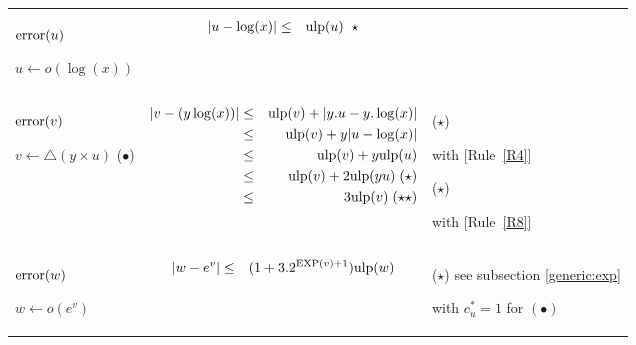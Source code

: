 \documentclass[12pt]{amsart}
\def\pinf{\bigtriangleup}
\def\ulp{{\rm ulp}}
\def\Exp{{\rm EXP}}
\newcommand{\U}[1]{\quad \mbox{[Rule~\ref{#1}]}}
\begin{document}
\begin{center}
\begin{tabular}{l l l}

\begin{minipage}{2.5cm}


${\textnormal{error}}(u)$


$u \leftarrow o(\log(x))$

\end{minipage} &
\begin{minipage}{7.5cm}

\begin{eqnarray}\nonumber
  |u-\log(x)| &\leq& \ulp(u)\;\;\star
\end{eqnarray}

\end{minipage} &
\begin{minipage}{6cm}

\end{minipage}\\%
\begin{minipage}{2.5cm}
${\textnormal{error}}(v)$


$v \leftarrow \pinf(y \times u) $
($\bullet$)
\end{minipage} &
\begin{minipage}{7.5cm}

\begin{eqnarray}\nonumber
  |v-(y\log(x))| &\leq& \ulp(v) + |y.u-y.\log(x)|\\\nonumber
   &\leq& \ulp(v) + y|u-\log(x)|\\\nonumber
   &\leq& \ulp(v) + y \ulp(u)\\\nonumber
   &\leq& \ulp(v) + 2 \ulp(yu) \;(\star)\\\nonumber
   &\leq& 3 \ulp(v)  \;(\star\star)
\end{eqnarray}


\end{minipage} &
\begin{minipage}{6cm}
($\star$)

with \U{R4}

($\star$)

with \U{R8}

\end{minipage}\\%
\begin{minipage}{2.5cm}
${\textnormal{error}}(w)$


$w \leftarrow o(e^v) $

\end{minipage} &
\begin{minipage}{7.5cm}
\begin{eqnarray}\nonumber
  |w-e^v| &\leq& (1+3.2^{\Exp(v)+1}) \ulp(w)
\end{eqnarray}
\end{minipage} &
\begin{minipage}{6cm}
($\star$)
see subsection \ref{generic:exp}

with $c_u^* = 1$ for $(\bullet)$
\end{minipage}
\end{tabular}
\end{center}
\end{document}
